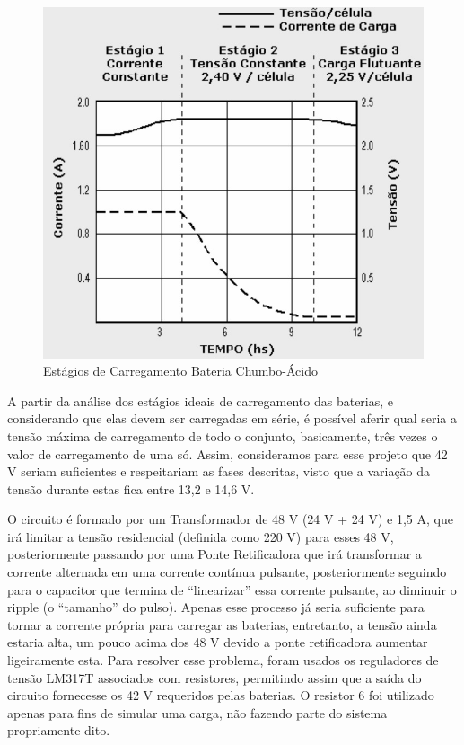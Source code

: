 \graphicspath{{figuras/}}
\begin{figure}[h]
\centering
\includegraphics[scale=0.50]{estagio_carregamento}
\caption{Estágios de Carregamento Bateria Chumbo-Ácido}
\label{estagio_carregamento}
\end{figure}

A partir da análise dos estágios ideais de carregamento das baterias, e considerando que elas devem ser carregadas em série, é possível aferir qual seria a tensão máxima de carregamento de todo o conjunto, basicamente, três vezes o valor de carregamento de uma só. Assim, consideramos para esse projeto que 42 V seriam suficientes e respeitariam as fases descritas, visto que a variação da tensão durante estas fica entre 13,2 e 14,6 V.

O circuito é formado por um Transformador de 48 V (24 V + 24 V) e 1,5 A, que irá limitar a tensão residencial (definida como 220 V) para esses 48 V, posteriormente passando por uma Ponte Retificadora que irá transformar a corrente alternada em uma corrente contínua pulsante, posteriormente seguindo para o capacitor que termina de “linearizar” essa corrente pulsante, ao diminuir o ripple (o “tamanho” do pulso). Apenas esse processo já seria suficiente para tornar a corrente própria para carregar as baterias, entretanto, a tensão ainda estaria alta, um pouco acima dos 48 V devido a ponte retificadora aumentar ligeiramente esta. Para resolver esse problema, foram usados os reguladores de tensão LM317T associados com resistores, permitindo assim que a saída do circuito fornecesse os 42 V requeridos pelas baterias. O resistor 6 foi utilizado apenas para fins de simular uma carga, não fazendo parte do sistema propriamente dito.


